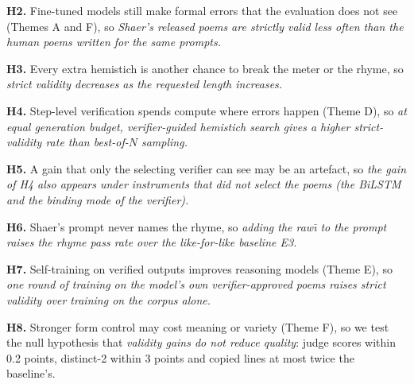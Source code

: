 \textbf{H2.} Fine-tuned models still make formal errors that the evaluation does not see (Themes A and F), so
\emph{Shaer's released poems are strictly valid less often than the human poems written for the same prompts.}

\textbf{H3.} Every extra hemistich is another chance to break the meter or the rhyme, so \emph{strict validity
decreases as the requested length increases.}

\textbf{H4.} Step-level verification spends compute where errors happen (Theme D), so \emph{at equal generation
budget, verifier-guided hemistich search gives a higher strict-validity rate than best-of-$N$ sampling.}

\textbf{H5.} A gain that only the selecting verifier can see may be an artefact, so \emph{the gain of H4 also appears
under instruments that did not select the poems (the BiLSTM and the binding mode of the verifier).}

\textbf{H6.} Shaer's prompt never names the rhyme, so \emph{adding the raw\={\i} to the prompt raises the rhyme pass
rate over the like-for-like baseline E3.}

\textbf{H7.} Self-training on verified outputs improves reasoning models (Theme E), so \emph{one round of training on
the model's own verifier-approved poems raises strict validity over training on the corpus alone.}

\textbf{H8.} Stronger form control may cost meaning or variety (Theme F), so we test the null hypothesis that
\emph{validity gains do not reduce quality}: judge scores within 0.2 points, distinct-2 within 3 points and copied
lines at most twice the baseline's.
